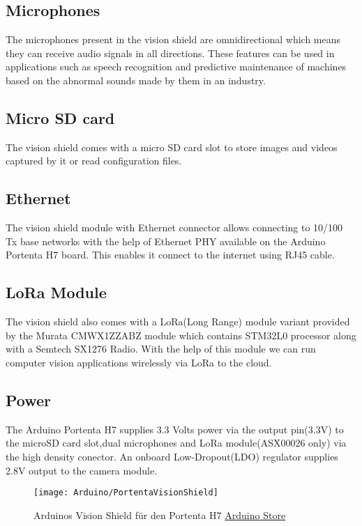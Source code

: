 	\subsection{Microphones} 
	The microphones present in the vision shield are omnidirectional which means they can receive audio signals in all directions. These features can be used in applications such as speech recognition and predictive maintenance of machines based on the abnormal sounds made by them in an industry.
	\subsection{Micro SD card} 
	The vision shield comes with a micro SD card slot to store images and videos captured by it or read configuration files. 
	
	\subsection{Ethernet}
	The vision shield module with Ethernet connector allows connecting to 10/100 Tx base networks with the help of Ethernet PHY available on the Arduino Portenta H7 board. This enables it connect to the internet using RJ45 cable.
	
	\subsection{LoRa Module}
	The vision shield also comes with a LoRa(Long Range) module variant provided by the Murata CMWX1ZZABZ module which contains STM32L0 processor along with a Semtech SX1276 Radio. With the help of this module we can run computer vision applications wirelessly via LoRa to the cloud.
	\subsection{Power}
	The Arduino Portenta H7 supplies 3.3 Volts power via the output pin(3.3V) to the microSD card slot,dual microphones and LoRa module(ASX00026 only) via the high density conector. An onboard Low-Dropout(LDO) regulator supplies 2.8V output to the camera module.
	
	


\begin{figure}
	\centering
  \texttt{[image: Arduino/PortentaVisionShield]}
\caption{Arduinos Vision Shield für den Portenta H7 \href{https://store.arduino.cc/portenta-h7}{Arduino Store}}
\end{figure}

